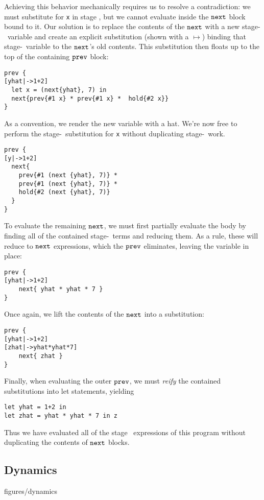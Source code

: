Achieving this behavior mechanically requires us to resolve a contradiction:
we must substitute for \texttt{x} in stage \bbone, but we cannot evaluate inside the ${\tt next}$ block bound to it. 
Our solution is to replace the contents of the ${\tt next}$ with a new stage-\bbtwo\ variable and create an explicit substitution (shown with a $\mapsto$) binding that stage-\bbtwo\ variable to the ${\tt next}$'s old contents.  
This substitution then floats up to the top of the containing ${\tt prev}$ block:
\begin{lstlisting} 
prev {
[yhat|->1+2]
  let x = (next{yhat}, 7) in
  next{prev{#1 x} * prev{#1 x} *  hold{#2 x}}
}
\end{lstlisting}
As a convention, we render the new variable with a %
hat.  We're now free to perform the stage-\bbone~substitution for {\tt x} without duplicating stage-\bbtwo\ work.
\begin{lstlisting} 
prev {
[y|->1+2]
  next{
    prev{#1 (next {yhat}, 7)} * 
    prev{#1 (next {yhat}, 7)} *
    hold{#2 (next {yhat}, 7)}
  }
}
\end{lstlisting}
To evaluate the remaining ${\tt next}$, we must first partially evaluate the body by finding all of the contained stage-\bbone~terms and reducing them. 
As a rule, these will reduce to ${\tt next}$ expressions, which the ${\tt prev}$ eliminates, leaving the variable in place:
\begin{lstlisting} 
prev {
[yhat|->1+2]
    next{ yhat * yhat * 7 }
}
\end{lstlisting}
Once again, we lift the contents of the ${\tt next}$ into a substitution:
\begin{lstlisting} 
prev {
[yhat|->1+2]
[zhat|->yhat*yhat*7]
    next{ zhat }
}
\end{lstlisting}
Finally, when evaluating the outer ${\tt prev}$, we must {\em reify} the contained substitutions into let statements, yielding
\begin{lstlisting} 
let yhat = 1+2 in
let zhat = yhat * yhat * 7 in z
\end{lstlisting}

Thus we have evaluated all of the stage \bbone\ expressions of this program without duplicating the contents of ${\tt next}$ blocks.

\subsection{Dynamics}
\label{ssec:dynamics}

 {figures/dynamics}

